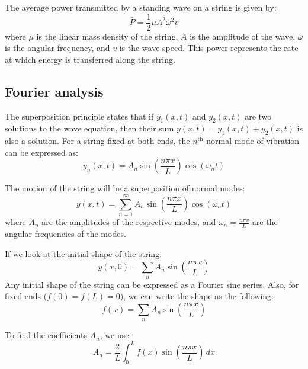 \documentclass[11pt]{report}
\begin{document}
\begin{definition}
    The average power transmitted by a standing wave on a string is given by:
    $$
        \bar{P} = \frac{1}{2} \mu A^2 \omega^2 v
    $$
    where \( \mu \) is the linear mass density of the string, \( A \) is the amplitude of the wave, \( \omega \) is the angular frequency, and \( v \) is the wave speed. This power represents the rate at which energy is transferred along the string.
    
\end{definition}
\subsection{Fourier analysis}
\begin{definition}
    The superposition principle states that if $y_1(x,t)$ and $y_2(x,t)$ are two solutions to the wave equation, then their sum $y(x,t) = y_1(x,t) + y_2(x,t)$ is also a solution. For a string fixed at both ends, the $n^\text{th}$ normal mode of vibration can be expressed as:
    \begin{equation}
        y_n(x,t) = A_n \sin\left(\frac{n\pi x}{L}\right) \cos(\omega_n t)
    \end{equation}
    
    The motion of the string will be a superposition of normal modes:
    \begin{equation}
        y(x,t) = \sum_{n=1}^{\infty} A_n \sin\left(\frac{n\pi x}{L}\right) \cos(\omega_n t)
    \end{equation}
    where \( A_n \) are the amplitudes of the respective modes, and \( \omega_n = \frac{n\pi v}{L} \) are the angular frequencies of the modes.
\end{definition}

\begin{definition}
    If we look at the initial shape of the string:
    $$
        y(x,0) = \sum_n A_n \sin\left(\frac{n\pi x}{L}\right)
    $$
    Any initial shape of the string can be expressed as a Fourier sine series. Also, for fixed ends ($f(0)=f(L)=0$), we can write the shape as the following:
    $$
        f(x) = \sum_n A_n \sin\left(\frac{n\pi x}{L}\right)
    $$


    To find the coefficients \( A_n \), we use:
    \begin{equation}
        A_n = \frac{2}{L} \int_0^L f(x) \sin\left(\frac{n\pi x}{L}\right) \, dx
    \end{equation}
\end{definition}
\end{document}
